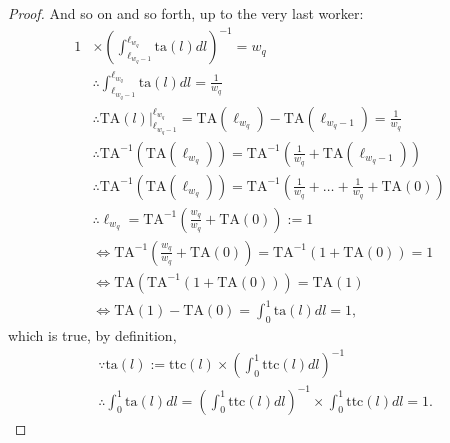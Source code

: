 \documentclass[hidelinks, nonatbib]{elsarticle}
\begin{document}
\begin{lemma}
\begin{proof}
        And so on and so forth, up to the very last worker:
        \begin{align}
        1 
        &\times 
        \left(
            \int_{\ell_{w_q - 1}}^{\ell_{w_q}}
            \text{ta}(l)
            dl
        \right) ^ {-1}
        =
        w_q
        \\
        &\therefore
        \int_{\ell_{w_q - 1}}^{\ell_{w_q}}
        \text{ta}(l)
        dl
        =
        \frac{1}{w_q}
        \\
        &\therefore
        \text{TA}(l)
        \big|_{\ell_{w_q - 1}}^{\ell_{w_q}}
        =
        \text{TA}(\ell_{w_q})
        -
        \text{TA}(\ell_{w_q - 1})
        =
        \frac{1}{w_q}
        \\
        &\therefore
        \text{TA}^{-1}(
            \text{TA}(\ell_{w_q})
        )
        =
        \text{TA}^{-1}\left(
            \frac{1}{w_q}
            +
            \text{TA}(\ell_{w_q - 1})
        \right)
        \\
        &\therefore
        \text{TA}^{-1}(
            \text{TA}(\ell_{w_q})
        )
        =
        \text{TA}^{-1}\left(
            \frac{1}{w_q}
            +
            \dots
            +
            \frac{1}{w_q}
            +
            \text{TA}(0)
        \right)
        \\
        &\therefore
        \ell_{w_q}
        =
        \text{TA}^{-1}\left(
            \frac{w_q}{w_q}
            +
            \text{TA}(0)
        \right)
        := 1
        \\
        &\iff
        \text{TA}^{-1}\left(
            \frac{w_q}{w_q}
            +
            \text{TA}(0)
        \right)
        =
        \text{TA}^{-1}\left(
            1
            +
            \text{TA}(0)
        \right)
        =
        1
        \\
        &\iff
        \text{TA}\left(
            \text{TA}^{-1}\left(
            1
            +
            \text{TA}(0)
        \right)
        \right)
        =
        \text{TA}(1)
        \\
        &\iff
        \text{TA}(1)
        -
        \text{TA}(0)
        =
        \int_{0}^{1}{
            \text{ta}(l)
            dl
        }
        =
        1
        ,
        \end{align}
        which is true, by definition,
        \begin{align}
        &\because
        \text{ta}(l) 
        :=
        \text{ttc}(l)
        \times
        \left(
            \int_{0}^{1}{
                \text{ttc}(l)
                dl
            }
        \right) ^ {-1}
        \\
        &\therefore
        \int_{0}^{1}{
            \text{ta}(l)
            dl
        }
        =
        \left(
            \int_{0}^{1}
            \text{ttc}(l)
            dl
        \right) ^ {-1}
        \times
        \int_{0}^{1}{
            \text{ttc}(l)
            dl
        }
        =
        1
        .
        \end{align}
        

\end{proof}
\end{lemma}
\end{document}
